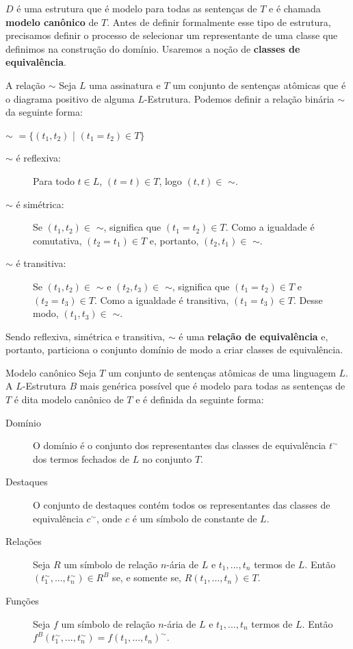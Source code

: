 $D$ é uma estrutura que é modelo para todas as sentenças de $T$ e é chamada \textbf{modelo canônico} de $T$. Antes de definir formalmente esse tipo de estrutura, precisamos definir o processo de selecionar um representante de uma classe que definimos na construção do domínio. Usaremos a noção de \textbf{classes de equivalência}. 
\begin{definition}{A relação $\sim$}
    Seja $L$ uma assinatura e $T$ um conjunto de sentenças atômicas que é o diagrama positivo de alguma $L$-Estrutura. Podemos definir a relação binária $\sim$ da seguinte forma:
    \begin{center}
        $\sim$ $= \{(t_1,t_2)$ | $(t_1 = t_2) \in T\}$
    \end{center}
    \begin{description}
        \item[$\sim$ é reflexiva:] Para todo $t \in L$, $(t = t) \in T$, logo $(t,t) \in$ $\sim$.
        \item[$\sim$ é simétrica:] Se $(t_1,t_2) \in$ $\sim$, significa que $(t_1 = t_2) \in T$. Como a igualdade é comutativa, $(t_2 = t_1) \in T$ e, portanto, $(t_2,t_1) \in$ $\sim$.
        \item[$\sim$ é transitiva:] Se $(t_1,t_2) \in$ $\sim$ e $(t_2,t_3) \in$ $\sim$, significa que $(t_1 = t_2) \in T$ e $(t_2 = t_3) \in T$. Como a igualdade é transitiva, $(t_1 = t_3) \in T$. Desse modo, $(t_1,t_3) \in$ $\sim$.
    \end{description}
    Sendo reflexiva, simétrica e transitiva, $\sim$ é uma \textbf{relação de equivalência} e, portanto, particiona o conjunto domínio de modo a criar classes de equivalência.
    \end{definition}
    \begin{definition}{Modelo canônico}
    Seja $T$ um conjunto de sentenças atômicas de uma linguagem $L$. A $L$-Estrutura $B$ mais genérica possível que é modelo para todas as sentenças de $T$ é dita modelo canônico de $T$ e é definida da seguinte forma:
    \begin{description}
        \item[Domínio] O domínio é o conjunto dos representantes das classes de equivalência $t^\sim$ dos termos fechados de $L$ no conjunto $T$.
        \item[Destaques] O conjunto de destaques contém todos os representantes das classes de equivalência $c^\sim$, onde $c$ é um símbolo de constante de $L$.
        \item[Relações] Seja $R$ um símbolo de relação $n$-ária de $L$ e $t_1,...,t_n$ termos de $L$. Então $(t_1^\sim,...,t_n^\sim) \in R^B$ se, e somente se, $R(t_1,...,t_n) \in T.$
        \item[Funções] Seja $f$ um símbolo de relação $n$-ária de $L$ e $t_1,...,t_n$ termos de $L$. Então $f^B(t_1^\sim,...,t_n^\sim) = f(t_1,...,t_n)^\sim$.
    \end{description}
\end{definition}

